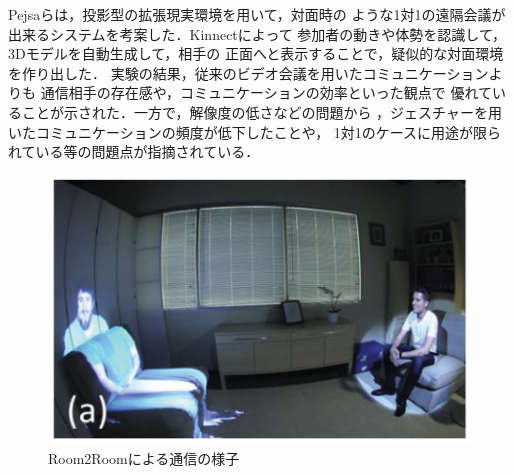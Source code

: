 Pejsaら\cite{27}は，投影型の拡張現実環境を用いて，対面時の
ような1対1の遠隔会議が出来るシステムを考案した．Kinnectによって
参加者の動きや体勢を認識して，3Dモデルを自動生成して，相手の
正面へと表示することで，疑似的な対面環境を作り出した．
実験の結果，従来のビデオ会議を用いたコミュニケーションよりも
通信相手の存在感や，コミュニケーションの効率といった観点で
優れていることが示された．一方で，解像度の低さなどの問題から
，ジェスチャーを用いたコミュニケーションの頻度が低下したことや，
1対1のケースに用途が限られている等の問題点が指摘されている．
\begin{figure}[tbp]
  \centering
  \includegraphics[scale=1.2]{fig/2room2.png}
  \caption{Room2Roomによる通信の様子\cite{27}}
\end{figure}

